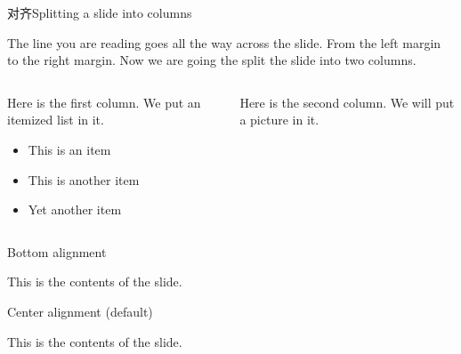 \documentclass[t]{beamer}
\begin{document}
		\begin{frame}{对齐Splitting a slide into columns}

			The line you are reading goes all the way across the slide.
			From the left margin to the right margin.  Now we are going
			the split the slide into two columns.
			\bigskip
			\begin{columns}[T]
				\begin{column}{0.5\textwidth}
					Here is the first column.  We put an itemized list in it.
					\begin{itemize}
						\item This is an item
						\item This is another item
						\item Yet another item
					\end{itemize}
				\end{column}

				\begin{column}{0.3\textwidth}
					Here is the second column.  We will put a picture in it.
					\end{column}
				\end{columns}
			\end{frame}

			\begin{frame}[b]{Bottom alignment} 

				This is the contents of the slide. 

			\end{frame} 
			\begin{frame}[c]{Center alignment (default)} %

				This is the contents of the slide. 

			\end{frame} 



			
\end{document}
